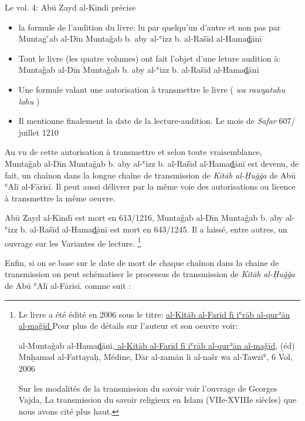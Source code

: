 \documentclass[a4paper,12pt]{report}
\begin{document}
 Le vol. 4:  Abū Zayd al-Kind\=i précise 

\begin{itemize}


\item  la formule de l'audition du livre: lu par quelqu'un d'autre et non pas  par Muntag
̌ab al-Dīn  Muntaǧab b. aby al-ʿizz b. al-Rašīd al-Hamaḏ̠ān\=i

\item  Tout le livre (les quatre volumes) ont fait l'objet d'une leture audition à:  Muntaǧab al-Dīn  Muntaǧab b. aby al-ʿizz b. al-Rašīd al-Hamaḏ̠ān\=i 

\item Une formule valant une autorisation à transmettre le livre ( \textit{wa rawyatuhu lahu}  )

\item Il mentionne finalement  la date de la lecture-audition. Le  mois de \textit{Safar} 607/ juillet 1210
\end{itemize}

Au vu de cette autorisation à transmettre et selon  toute vraisemblance, Muntaǧab al-Dīn  Muntaǧab b. aby al-ʿizz b. al-Rašīd al-Hamaḏ̠ān\=i 
est devenu, de fait, un chaînon dans la  longue chaîne de transmission de \textit{ Kitāb al-Ḥuǧǧa} de Abū ʿAlī al-Fāris\=i. Il peut aussi délivrer par la même voie des autorisations ou licence à transmettre la même oeuvre.  

Abū Zayd al-Kind\=i est mort en 613/1216, Muntaǧab al-Dīn  Muntaǧab b. aby al-ʿizz b. al-Rašīd al-Hamaḏ̠ān\=i est mort en 643/1245. Il  a laissé, entre autres,    un ouvrage sur les Variantes de lecture. \footnote {Le livre  a été édité en 2006 sous le titre: \underline {al-Kitāb al-Farīd fī iʿrāb  al-qurʾān al-maǧīd
}
Pour plus de détails sur l'auteur et son oeuvre voir: 

al-Muntaǧab al-Hamaḏ̠āni,\underline{ al-Kitāb al-Farīd fī iʿrāb  al-qurʾān al-maǧīd}, (éd) Muḥamad al-Fattayaḥ, Médine, Dār al-zamān li al-našr wa al-Tawzīʿ, 6 Vol,  2006 

 Sur les modalités de la transmission du savoir  voir l'ouvrage de Georges Vajda, La transmission du savoir religieux en Islam (VIIe-XVIIIe siècles)  que nous avons cité plus haut.} 

Enfin, si on se base sur le date de mort de chaque chaînon dans la chaine de transmission  on peut schématiser le processus de transmission de \textit{Kitāb al-Ḥuǧǧa} de Abū ʿAlī al-Fārisī.  comme suit :
\end{document}
